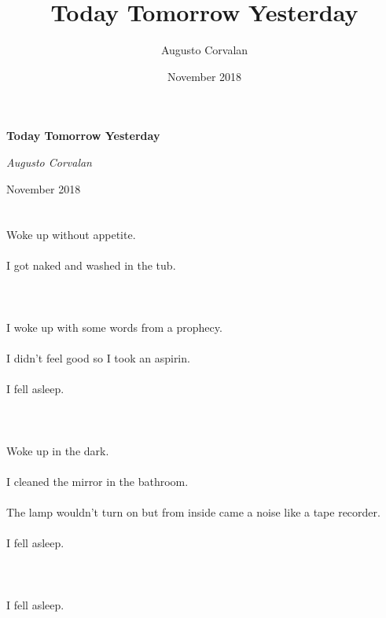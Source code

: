 \documentclass{article}
\title{Today Tomorrow Yesterday}
\date{November 2018}
\author{Augusto Corvalan}
\begin{document}
    \begin{titlepage}
    \centering
    {\huge\bfseries Today Tomorrow Yesterday \par}
    \vspace{2cm}
    {\Large\itshape Augusto Corvalan\par}
    \vfill
    {\large November 2018\par}
    \end{titlepage}

    
    \section{}
    Woke up without appetite.\\\\I got naked and washed in the tub.\\\\ 
    \newpage
    
    \section{}
    I woke up with some words from a prophecy.\\\\I didn't feel good so I took an aspirin.\\\\I fell asleep.\\\\ 
    \newpage
    
    \section{}
    Woke up in the dark.\\\\I cleaned the mirror in the bathroom.\\\\The lamp wouldn't turn on but from inside came a noise like a tape recorder.\\\\I fell asleep.\\\\ 
    \newpage
    
    \section{}
    I fell asleep.\\\\ 
    \newpage
    
\end{document}
